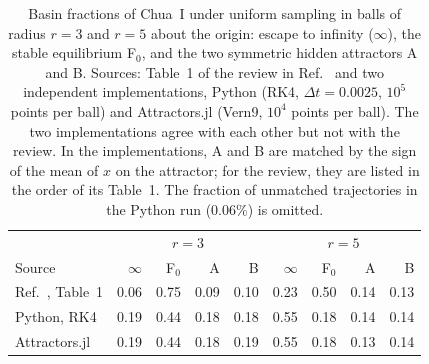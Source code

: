 
\begin{table}[tbhp]
\centering
\caption{Basin fractions of Chua~I under uniform sampling in balls of radius $r=3$ and $r=5$ about the origin: escape to infinity ($\infty$), the stable equilibrium F$_0$, and the two symmetric hidden attractors A and B. Sources: Table~1 of the review in Ref.~\cite{GuanXie2025} and two independent implementations, Python (RK4, $\Delta t=0.0025$, $10^5$ points per ball) and Attractors.jl (Vern9, $10^4$ points per ball). The two implementations agree with each other but not with the review. In the implementations, A and B are matched by the sign of the mean of $x$ on the attractor; for the review, they are listed in the order of its Table~1. The fraction of unmatched trajectories in the Python run (0.06\%) is omitted.}
\label{tab:chuafrac}
\footnotesize
\setlength{\tabcolsep}{3pt}

\begin{tabular}{lrrrrrrrr}
\toprule
 & \multicolumn{4}{c}{$r=3$} & \multicolumn{4}{c}{$r=5$} \\
Source & $\infty$ & F$_0$ & A & B & $\infty$ & F$_0$ & A & B \\
\midrule
Ref.~\cite{GuanXie2025}, Table~1 & 0.06 & 0.75 & 0.09 & 0.10 & 0.23 & 0.50 & 0.14 & 0.13 \\
Python, RK4 & 0.19 & 0.44 & 0.18 & 0.18 & 0.55 & 0.18 & 0.14 & 0.14 \\
Attractors.jl & 0.19 & 0.44 & 0.18 & 0.19 & 0.55 & 0.18 & 0.13 & 0.14 \\
\bottomrule
\end{tabular}

\end{table}

